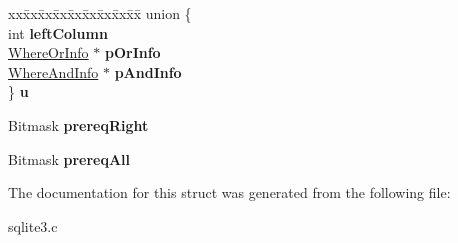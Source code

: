 \begin{DoxyCompactItemize}
\item 
\begin{tabbing}
xx\=xx\=xx\=xx\=xx\=xx\=xx\=xx\=xx\=\kill
union \{\\
\>int {\bfseries leftColumn}\\
\>\hyperlink{structWhereOrInfo}{WhereOrInfo} $\ast$ {\bfseries pOrInfo}\\
\>\hyperlink{structWhereAndInfo}{WhereAndInfo} $\ast$ {\bfseries pAndInfo}\\
\} {\bfseries u}\hypertarget{structWhereTerm_a4bbde9b3e4aaa3ed49772b8f11b02250}{}\label{structWhereTerm_a4bbde9b3e4aaa3ed49772b8f11b02250}
\\

\end{tabbing}\item 
Bitmask {\bfseries prereq\+Right}\hypertarget{structWhereTerm_a1274011fa1ef0639284b7944f4570e67}{}\label{structWhereTerm_a1274011fa1ef0639284b7944f4570e67}

\item 
Bitmask {\bfseries prereq\+All}\hypertarget{structWhereTerm_a49b700336b005067352366cfc40de07f}{}\label{structWhereTerm_a49b700336b005067352366cfc40de07f}

\end{DoxyCompactItemize}


The documentation for this struct was generated from the following file\+:\begin{DoxyCompactItemize}
\item 
sqlite3.\+c\end{DoxyCompactItemize}
